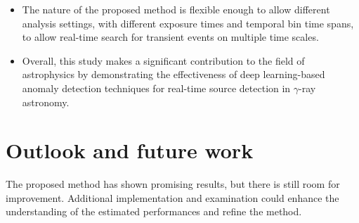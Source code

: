 \begin{itemize}
    \item The nature of the proposed method is flexible enough to allow different analysis settings, with different exposure times and temporal bin time spans, to allow real-time search for transient events on multiple time scales.  
    
    \item Overall, this study makes a significant contribution to the field of astrophysics by demonstrating the effectiveness of deep learning-based anomaly detection techniques for real-time source detection in $\gamma$-ray astronomy. 
    
\end{itemize}


\section{Outlook and future work}

The proposed method has shown promising results, but there is still room for improvement. Additional implementation and examination could enhance the understanding of the estimated  performances and refine the method. 

